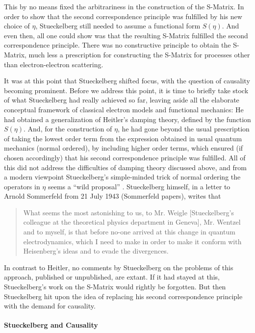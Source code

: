 \documentclass[12pt,a4paper]{article}
\begin{document}
This by no means fixed the arbitrariness in the construction of the S-Matrix. In order to show that the second correspondence principle was fulfilled by his new choice of $\eta$, Stueckelberg still needed to assume a functional form $S(\eta)$. And even then, all one could show was that the resulting S-Matrix fulfilled the second correspondence principle. There was no constructive principle to obtain the S-Matrix, much less a prescription for constructing the S-Matrix for processes other than electron-electron scattering.

It was at this point that Stueckelberg shifted focus, with the question of causality becoming prominent. Before we address this point, it is time to briefly take stock of what Stueckelberg had really achieved so far, leaving aside all the elaborate conceptual framework of classical electron models and functional mechanics: He had obtained a generalization of Heitler's damping theory, defined by the function $S(\eta)$. And, for the construction of $\eta$, he had gone beyond the usual prescription of taking the lowest order term from the expression obtained in usual quantum mechanics (normal ordered), by including higher order terms, which ensured (if chosen accordingly) that his second correspondence principle was fulfilled. All of this did not address the difficulties of damping theory discussed above, and from a modern viewpoint Stueckelberg's simple-minded trick of normal ordering the operators in $\eta$ seems a ``wild proposal'' \citep[p. 96]{wanders_2009_stueckelberg}. Stueckelberg himself, in a letter to Arnold Sommerfeld from 21 July 1943 (Sommerfeld papers), writes that

\begin{quote}
What seems the most astonishing to us, to Mr. Weigle [Stueckelberg's colleague at the theoretical physics department in Geneva], Mr. Wentzel and to myself, is that before no-one arrived at this change in quantum electrodynamics, which I need to make in order to make it conform with Heisenberg's ideas and to evade the divergences.
\end{quote}

In contrast to Heitler, no comments by Stueckelberg on the problems of this approach, published or unpublished, are extant. If it had stayed at this, Stueckelberg's work on the S-Matrix would rightly be forgotten. But then Stueckelberg hit upon the idea of replacing his second correspondence principle with the demand for causality.

\paragraph{Stueckelberg and Causality}
\end{document}
